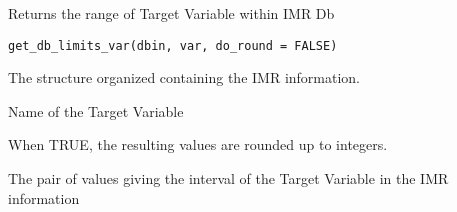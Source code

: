 %
\begin{Description}\relax
Returns the range of Target Variable within IMR Db
\end{Description}
%
\begin{Usage}
\begin{verbatim}
get_db_limits_var(dbin, var, do_round = FALSE)
\end{verbatim}
\end{Usage}
%
\begin{Arguments}
\begin{ldescription}
\item[\code{dbin}] 
The  structure organized containing the IMR
information.

\item[\code{var}] 
Name of the Target Variable

\item[\code{do\_round}] 
When TRUE, the resulting values are rounded up to integers.

\end{ldescription}
\end{Arguments}
%
\begin{Value}
The pair of values giving the interval of the Target Variable in the IMR information
\end{Value}
